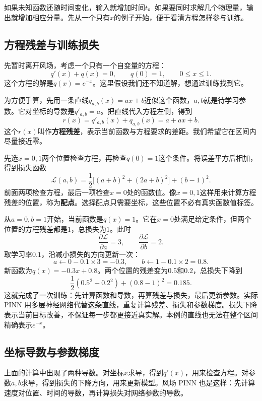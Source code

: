 如果未知函数还随时间变化，输入就增加时间$t$。如果要同时求解几个物理量，输出就增加相应分量。先从一个只有$x$的例子开始，便于看清方程怎样参与训练。

\subsection{方程残差与训练损失}
先暂时离开风场，考虑一个只有一个自变量的方程：
\begin{equation}
 q'(x)+q(x)=0,\qquad q(0)=1,\qquad 0\leq x\leq1.
 \label{eq:pinn-hand-ode}
\end{equation}
这个方程的解是$q(x)=e^{-x}$。这里假设我们还不知道解，想通过训练找到它。

为方便手算，先用一条直线$q_{a,b}(x)=ax+b$近似这个函数，$a,b$就是待学习参数。它对坐标的导数是$q'_{a,b}=a$。把直线代入方程左侧，得到
\[
 r(x)=q'_{a,b}(x)+q_{a,b}(x)=a+ax+b.
\]
这个$r(x)$叫作\textbf{方程残差}，表示当前函数与方程要求的差距。我们希望它在区间内尽量接近零。

先选$x=0,1$两个位置检查方程，再检查$q(0)=1$这个条件。将误差平方后相加，得到损失函数
\begin{equation}
 \mathcal L(a,b)=\frac12\big[(a+b)^2+(2a+b)^2\big]+(b-1)^2.
 \label{eq:pinn-hand-loss}
\end{equation}
前面两项检查方程，最后一项检查$x=0$处的函数值。像$x=0,1$这样用来计算方程残差的位置，称为\textbf{配点}。选择配点只需要坐标，这些位置不必有真实函数值标签。

从$a=0,b=1$开始，当前函数是$q(x)=1$。它在$x=0$处满足给定条件，但两个位置的方程残差都是$1$，总损失为$1$。此时
\[
 \frac{\partial\mathcal L}{\partial a}=3,\qquad
 \frac{\partial\mathcal L}{\partial b}=2.
\]
取学习率$0.1$，沿减小损失的方向更新一次：
\[
 a\leftarrow0-0.1\times3=-0.3,\qquad
 b\leftarrow1-0.1\times2=0.8.
\]
新函数为$q(x)=-0.3x+0.8$。两个位置的残差变为$0.5$和$0.2$，总损失下降到
\[
 \frac12(0.5^2+0.2^2)+(0.8-1)^2=0.185.
\]
这就完成了一次训练：先计算函数和导数，再算残差与损失，最后更新参数。实际 PINN 用多层神经网络代替这条直线，重复计算残差、损失和参数梯度。损失下降表示当前目标改善，不保证每一步都更接近真实解。本例的直线也无法在整个区间精确表示$e^{-x}$。

\subsection{坐标导数与参数梯度}
上面的计算中出现了两种导数。对坐标$x$求导，得到$q'(x)$，用来检查方程。对参数$a,b$求导，得到损失的下降方向，用来更新模型。风场 PINN 也是这样：先计算速度对位置、时间的导数，再计算损失对网络参数的导数。

